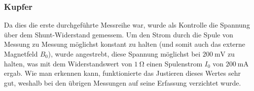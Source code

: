 {%
    \clearpage
    \pdfpagewidth
	\textwidth
    \addtolength{\textwidth}{70mm}

    \subsubsection{Kupfer}
    \label{sec:ausw:subsec:hohlz:subsubsec:copper}

	\begin{minipage}[t]{0.33\textwidth}
        \vspace{0pt}



        Da dies die  erste durchgef\"uhrte Messreihe war,  wurde als Kontrolle
        die Spannung \"uber dem Shunt-Widerstand gemessem.  Um den Strom durch
        die Spule von  Messung zu Messung m\"oglichst konstant  zu halten (und
        somit  auch das  externe  Magnetfeld $B_0$),  wurde angestrebt,  diese
        Spannung m\"oglichst  bei $\SI{200}{\milli\volt}$  zu halten,  was mit
        dem  Widerstandswert von  $\SI{1}{\ohm}$ einen  Spulenstrom $I_0$  von
        $\SI{200}{\milli\ampere}$ ergab.  Wie man erkennen kann, funktionierte
        das  Justieren  dieses Wertes  sehr  gut,  weshalb bei  den  \"ubrigen
        Messungen auf seine Erfassung verzichtet wurde.


\end{minipage}}
